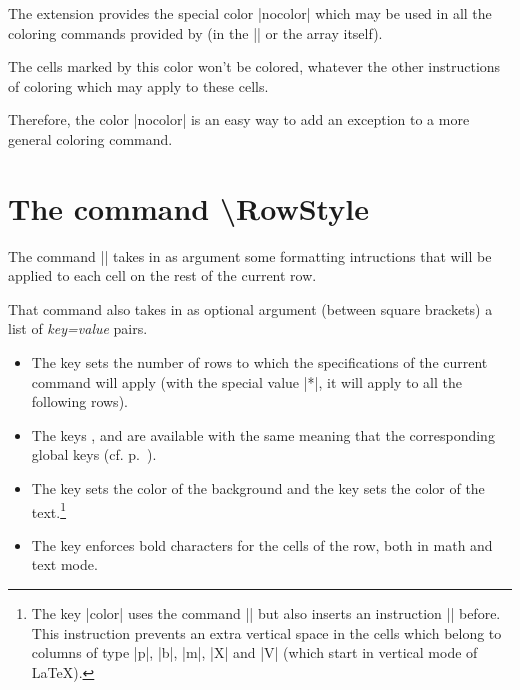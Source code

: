 \documentclass[dvipsnames]{article}%
\begin{document}

The extension  provides the special color |nocolor| which may be
used in all the coloring commands provided by  (in the
|\CodeBefore| or the array itself).

The cells marked by this color won't be colored, whatever the other instructions
of coloring which may apply to these cells.

Therefore, the color |nocolor| is an easy way to add an exception to a more
general coloring command.

\section{The command \textbackslash RowStyle}

\label{RowStyle}


The command |\RowStyle| takes in as argument some formatting intructions that
will be applied to each cell on the rest of the current row.

\medskip
That command also takes in as optional argument (between square brackets)
a list of \textsl{key=value} pairs. 
\begin{itemize}
\item {} The key  sets
the number of rows to which the specifications of the current command will
apply (with the special value |*|, it will apply to all the following rows).
\item The keys ,  and
 are available with the same meaning that the
corresponding global keys (cf. p.~\pageref{cell-space}).
\item {}
The key  sets the color of the background and the key
 sets the color of the text.\footnote{The key |color| uses the command
|\color| but also inserts an instruction |\leavevmode| before. This
instruction prevents an extra vertical space in the cells which belong to
columns of type |p|, |b|, |m|, |X| and |V| (which start in
vertical mode of LaTeX).}
\item {} The key
 enforces bold characters for the cells of the row, both in
math and text mode. 
\end{itemize}
\end{document}
